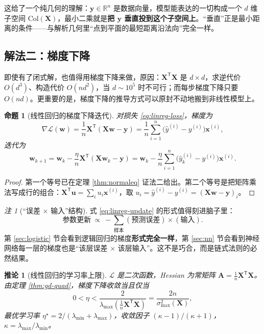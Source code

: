 \documentclass[UTF8,a4paper,11pt]{ctexart}
\theoremstyle{definition}
\theoremstyle{plain}
\newtheorem{proposition}[definition]{命题}
\newtheorem{corollary}[definition]{推论}
\theoremstyle{remark}
\newtheorem{remark}[definition]{注}
\newcommand{\R}{\mathbb{R}}
\newcommand{\Loss}{\mathcal{L}}
\newcommand{\T}{^{\mathsf{T}}}
\begin{document}
这给了一个纯几何的理解：$\bm{y}\in\R^n$ 是数据向量，模型能表达的一切构成一个 $d$ 维子空间 $\mathrm{Col}(\bm{X})$，最小二乘就是\textbf{把 $\bm{y}$ 垂直投到这个子空间上}。“垂直”正是最小距离的条件——与解析几何里“点到平面的最短距离沿法向”完全一样。

\subsection{解法二：梯度下降}

即使有了闭式解，也值得用梯度下降来做，原因：$\bm{X}\T\bm{X}$ 是 $d\times d$，求逆代价 $O(d^3)$、构造代价 $O(nd^2)$，当 $d\sim10^5$ 时不可行；而每步梯度下降只要 $O(nd)$。更重要的是，梯度下降的推导方式可以原封不动地搬到非线性模型上。

\begin{proposition}[线性回归的梯度下降迭代]\label{prop:linreg-gd}
对损失 \eqref{eq:linreg-loss}，梯度为
\begin{equation}\label{eq:linreg-grad}
  \nabla\Loss(\bm{w})=\frac1n\bm{X}\T(\bm{X}\bm{w}-\bm{y})=\frac1n\sum_{i=1}^{n}\big(\hat y^{(i)}-y^{(i)}\big)\bm{x}^{(i)},
\end{equation}
迭代为
\begin{equation}\label{eq:linreg-update}
  \bm{w}_{k+1}=\bm{w}_k-\frac{\eta}{n}\bm{X}\T(\bm{X}\bm{w}_k-\bm{y})
  = \bm{w}_k-\frac{\eta}{n}\sum_{i=1}^{n}\big(\hat y^{(i)}_k-y^{(i)}\big)\bm{x}^{(i)} .
\end{equation}
\end{proposition}

\begin{proof}
第一个等号已在定理 \ref{thm:normaleq} 证法二给出。第二个等号是把矩阵乘法写成行的组合：$\bm{X}\T\bm{u}=\sum_i u_i\bm{x}^{(i)}$，取 $u_i=\hat y^{(i)}-y^{(i)}=(\bm{X}\bm{w}-\bm{y})_i$。
\end{proof}

\begin{remark}[“误差 $\times$ 输入”结构]\label{rmk:err-times-input}
式 \eqref{eq:linreg-update} 的形式值得刻进脑子里：
\[
  \text{参数更新}\ \propto\ -\sum_{\text{样本}}(\text{预测误差})\times(\text{输入}) .
\]
第 \ref{sec:logistic} 节会看到逻辑回归的梯度\textbf{形式完全一样}，第 \ref{sec:nn} 节会看到神经网络每一层的梯度也是“该层误差 $\times$ 该层输入”。这不是巧合，而是链式法则的必然结果。
\end{remark}

\begin{corollary}[线性回归的学习率上限]\label{cor:linreg-eta}
$\Loss$ 是二次函数，Hessian 为常矩阵 $\bm{A}=\frac1n\bm{X}\T\bm{X}$。由定理 \ref{thm:gd-quad}，梯度下降收敛当且仅当
\[
  0<\eta<\frac{2}{\lambda_{\max}(\frac1n\bm{X}\T\bm{X})}=\frac{2n}{\sigma_{\max}^2(\bm{X})},
\]
最优学习率 $\eta^\star=2/(\lambda_{\min}+\lambda_{\max})$，收敛因子 $(\kappa-1)/(\kappa+1)$，$\kappa=\lambda_{\max}/\lambda_{\min}$。
\end{corollary}
\end{document}
